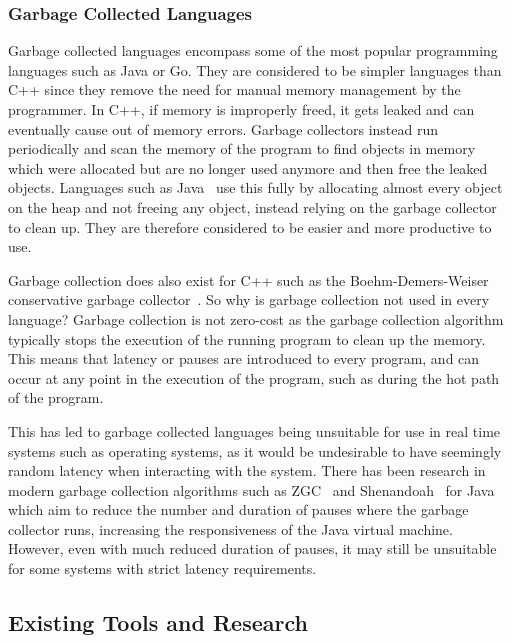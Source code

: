 \documentclass{proposal}
\begin{document}
    \subsubsection{Garbage Collected Languages}

    Garbage collected languages encompass some of the most popular programming languages such as Java or Go.
    They are considered to be simpler languages than C++ since they remove the need for manual memory management by the programmer.
    In C++, if memory is improperly freed, it gets leaked and can eventually cause out of memory errors.
    Garbage collectors instead run periodically and scan the memory of the program to find objects in memory which were allocated but are no longer used anymore and then free the leaked objects.
    Languages such as Java~\cite{Tauro2012} use this fully by allocating almost every object on the heap and not freeing any object, instead relying on the garbage collector to clean up.
    They are therefore considered to be easier and more productive to use.

    Garbage collection does also exist for C++ such as the Boehm-Demers-Weiser conservative garbage collector~\cite{Boehm2002}.
    So why is garbage collection not used in every language?
    Garbage collection is not zero-cost as the garbage collection algorithm typically stops the execution of the running program to clean up the memory.
    This means that latency or pauses are introduced to every program, and can occur at any point in the execution of the program, such as during the hot path of the program.

    This has led to garbage collected languages being unsuitable for use in real time systems such as operating systems, as it would be undesirable to have seemingly random latency when interacting with the system.
    There has been research in modern garbage collection algorithms such as ZGC~\cite{Liden2018} and Shenandoah~\cite{Flood2016} for Java which aim to reduce the number and duration of pauses where the garbage collector runs, increasing the responsiveness of the Java virtual machine.
    However, even with much reduced duration of pauses, it may still be unsuitable for some systems with strict latency requirements.

    \subsection{Existing Tools and Research}\label{subsec:existing-tools-and-research}
\end{document}
